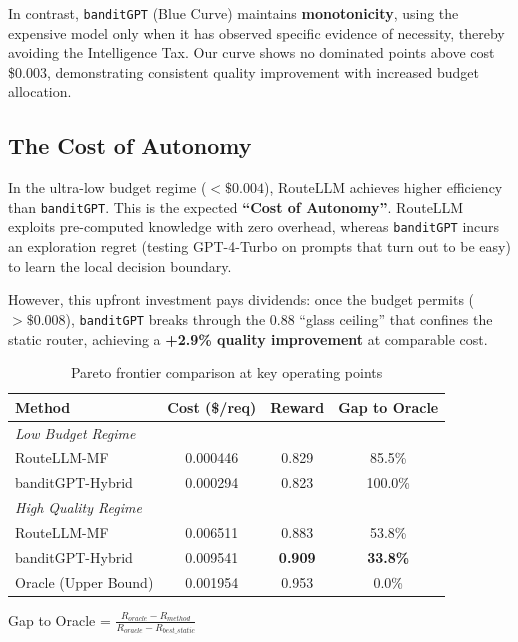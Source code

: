 In contrast, \texttt{banditGPT} (Blue Curve) maintains \textbf{monotonicity}, using the expensive model only when it has observed specific evidence of necessity, thereby avoiding the Intelligence Tax. Our curve shows no dominated points above cost \$0.003, demonstrating consistent quality improvement with increased budget allocation.

\subsection{The Cost of Autonomy}

In the ultra-low budget regime ($< \$0.004$), RouteLLM achieves higher efficiency than \texttt{banditGPT}. This is the expected \textbf{``Cost of Autonomy''}. RouteLLM exploits pre-computed knowledge with zero overhead, whereas \texttt{banditGPT} incurs an exploration regret (testing GPT-4-Turbo on prompts that turn out to be easy) to learn the local decision boundary. 

However, this upfront investment pays dividends: once the budget permits ($> \$0.008$), \texttt{banditGPT} breaks through the $0.88$ ``glass ceiling'' that confines the static router, achieving a \textbf{+2.9\% quality improvement} at comparable cost.

\begin{table}[t]
\centering
\caption{Pareto frontier comparison at key operating points}
\label{tab:pareto_comparison}
\begin{tabular}{lccc}
\toprule
\textbf{Method} & \textbf{Cost (\$/req)} & \textbf{Reward} & \textbf{Gap to Oracle} \\
\midrule
\multicolumn{4}{l}{\textit{Low Budget Regime}} \\
RouteLLM-MF & 0.000446 & 0.829 & 85.5\% \\
banditGPT-Hybrid & 0.000294 & 0.823 & 100.0\% \\
\midrule
\multicolumn{4}{l}{\textit{High Quality Regime}} \\
RouteLLM-MF & 0.006511 & 0.883 & 53.8\% \\
banditGPT-Hybrid & 0.009541 & \textbf{0.909} & \textbf{33.8\%} \\
\midrule
Oracle (Upper Bound) & 0.001954 & 0.953 & 0.0\% \\
\bottomrule
\end{tabular}
\vspace{0.5em}
\small{Gap to Oracle = $\frac{R_{oracle} - R_{method}}{R_{oracle} - R_{best\_static}}$}
\end{table}


